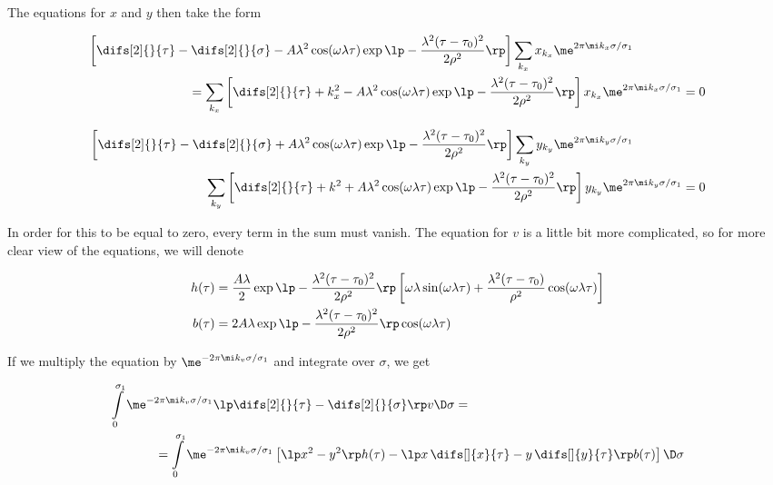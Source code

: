 \noindent
The equations for $x$ and $y$ then take the form

\begin{align}
\label{eq:grav_x_expand}
\begin{aligned}
        \left[ \difs[2]{ }{\tau} - \difs[2]{ }{\sigma} - A \lambda^2 \cos(\omega \lambda \tau)\exp \lp -\frac{\lambda^2(\tau-\tau_0)^2}{2 \rho^2} \rp \right] \sum\limits_{k_x} x_{k_x} \me^{2 \pi \mi k_x \sigma /\sigma_1} \hspace{2cm}\\
        = \sum\limits_{k_x} \left[ \difs[2]{ }{\tau} + k_x^2 - A \lambda^2 \cos(\omega \lambda \tau)\exp \lp -\frac{\lambda^2(\tau-\tau_0)^2}{2 \rho^2} \rp \right] x_{k_x} \me^{2 \pi \mi k_x \sigma /\sigma_1} = 0
\end{aligned}
        \\[3mm]
\label{eq:grav_y_expand}
\begin{aligned}
        \left[ \difs[2]{ }{\tau} - \difs[2]{ }{\sigma} + A \lambda^2 \cos(\omega \lambda \tau)\exp \lp -\frac{\lambda^2(\tau-\tau_0)^2}{2 \rho^2} \rp \right] \sum\limits_{k_y} y_{k_y} \me^{2 \pi \mi k_y \sigma /\sigma_1}  \hspace{2cm}\\
        \sum\limits_{k_y} \left[ \difs[2]{ }{\tau} +k^2 + A \lambda^2 \cos(\omega \lambda \tau)\exp \lp -\frac{\lambda^2(\tau-\tau_0)^2}{2 \rho^2} \rp \right]  y_{k_y} \me^{2 \pi \mi k_y \sigma /\sigma_1} = 0
\end{aligned}
 \end{align}
 
\noindent
In order for this to be equal to zero, every term in the sum must vanish. The equation for $v$ is a little bit more complicated, so for more clear view of the equations, we will denote

\begin{align}
    h(\tau) &  = \frac{A \lambda}{2} \exp \lp -\frac{\lambda^2(\tau-\tau_0)^2}{2 \rho^2} \rp \left[ \omega \lambda \sin(\omega \lambda \tau) + \frac{\lambda^2 (\tau - \tau_0)}{ \rho^2}\cos(\omega \lambda \tau) \right] \\
    b(\tau) & = 2 A \lambda \exp \lp -\frac{\lambda^2(\tau-\tau_0)^2}{2 \rho^2} \rp \cos(\omega \lambda \tau)
\end{align}

\noindent
If we multiply the equation by $\me^{-2 \pi \mi k_v \sigma / \sigma_1}$ and integrate over $\sigma$, we get

\begin{equation}
\label{eq:grav_v_expand}
\begin{aligned}
    \int\limits_{0}^{\sigma_1} \me^{-2 \pi \mi k_v \sigma /\sigma_1} \lp \difs[2]{ }{\tau} - \difs[2]{ }{\sigma} \rp v \D \sigma = \hspace{6cm} \\
    = \int\limits_{0}^{\sigma_1} \me^{-2 \pi \mi k_v \sigma /\sigma_1} 
    \left[ \lp x^2-y^2 \rp h(\tau) - \lp x \, \difs[]{x}{\tau} - y \, \difs[]{y}{\tau} \rp b(\tau) \right] \D \sigma
\end{aligned}
\end{equation}

